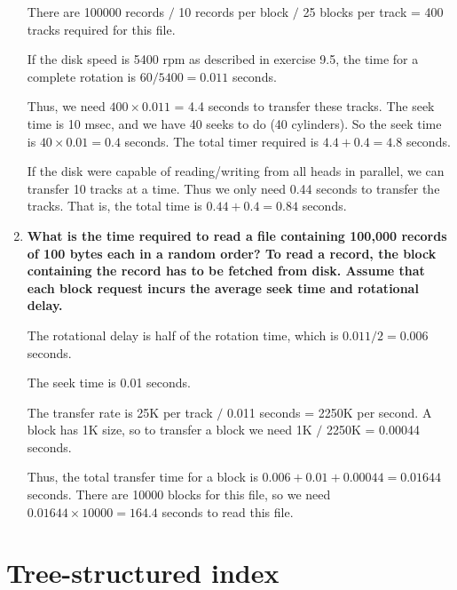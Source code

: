 \begin{enumerate}
There are 100000 records $/$ 10 records per block $/$ 25 blocks per track = 400 tracks required for this file.

If the disk speed is 5400 rpm as described in exercise 9.5, the time for a complete rotation is $60/5400 = 0.011$ seconds.

Thus, we need $400 \times 0.011$ = 4.4 seconds to transfer these tracks.  The seek time is 10 msec, and we have 40 seeks to do (40 cylinders).  So the seek time is $40 \times 0.01 = 0.4$ seconds.  The total timer required is $4.4+0.4 = 4.8$ seconds.

If the disk were capable of reading/writing from all heads in parallel, we can transfer 10 tracks at a time.  Thus we only need 0.44 seconds to transfer the tracks.  That is, the total time is $0.44+0.4 = 0.84$ seconds.

\item {\bf What is the time required to read a file containing 100,000 records of 100 bytes each in a random order? To read a record, the block containing the record has to be fetched from disk. Assume that each block request incurs the average seek time and rotational delay.}

The rotational delay is half of the rotation time, which is $0.011/2 = 0.006$ seconds.  

The seek time is 0.01 seconds.

The transfer rate is 25K per track $/$ 0.011 seconds = 2250K per second.  A block has 1K size, so to transfer a block we need 1K $/$ 2250K = 0.00044 seconds.

Thus, the total transfer time for a block is $0.006+0.01+0.00044 = 0.01644$ seconds.  There are 10000 blocks for this file, so we need $0.01644 \times 10000 = 164.4$ seconds to read this file.

\end{enumerate}

\section{Tree-structured index}
